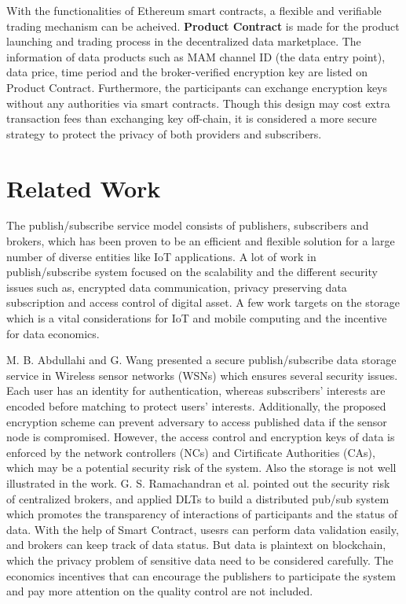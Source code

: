 \documentclass[conference]{IEEEtran}
\begin{document}
With the functionalities of Ethereum smart contracts, a flexible and verifiable trading mechanism can be acheived. \textbf{Product Contract} is made for the product launching and trading process in the decentralized data marketplace. The information of data products such as MAM channel ID (the data entry point), data price, time period and the broker-verified encryption key are listed on Product Contract. Furthermore, the participants can exchange encryption keys without any authorities via smart contracts. Though this design may cost extra transaction fees than exchanging key off-chain, it is considered a more secure strategy to protect the privacy of both providers and subscribers.

\section{Related Work}
The publish/subscribe service model consists of publishers, subscribers and brokers, which has been proven\cite{pubSubAnalysis, pubSubAnalysis2} to be an efficient and flexible solution for a large number of diverse entities like IoT applications. A lot of work in publish/subscribe system focused on the scalability and the different security issues such as, encrypted data communication, privacy preserving data subscription and access control of digital asset. A few work targets on the storage which is a vital considerations for IoT and mobile computing and the incentive for data economics.

M. B. Abdullahi and G. Wang\cite{centralPubSub} presented a secure publish/subscribe data storage service in Wireless sensor networks (WSNs) which ensures several security issues. Each user has an identity for authentication, whereas subscribers' interests are encoded before matching to protect users' interests. Additionally, the proposed encryption scheme can prevent adversary to access published data if the sensor node is compromised. However, the access control and encryption keys of data is enforced by the network controllers (NCs) and Cirtificate Authorities (CAs), which may be a potential security risk of the system. Also the storage is not well illustrated in the work. G. S. Ramachandran et al.\cite{trinity} pointed out the security risk of centralized brokers, and applied DLTs to build a distributed pub/sub system which promotes the transparency of interactions of participants and the status of data. With the help of Smart Contract, usesrs can perform data validation easily, and brokers can keep track of data status. But data is plaintext on blockchain, which the privacy problem of sensitive data need to be considered carefully. The economics incentives that can encourage the publishers to participate the system and pay more attention on the quality control are not included. 
\end{document}
